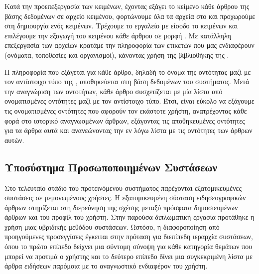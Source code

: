 {{{{{{{{\begin{itemize}
Κατά την προεπεξεργασία των κειμένων, έχοντας εξάγει το κείμενο κάθε άρθρου της βάσης δεδομένων σε αρχείο κειμένου, 
φορτώνουμε όλα τα αρχεία στο {} και προχωρούμε στη δημιουργία ενός {} κειμένων. 
Τρέχουμε το {} εργαλείο {} με είσοδο το {} κειμένων 
και επιλέγουμε την εξαγωγή του κειμένου κάθε άρθρου σε μορφή {} \cite{Gt02}.
Με κατάλληλη επεξεργασία των {} αρχείων κρατάμε την πληροφορία των ετικετών που μας ενδιαφέρουν (ονόματα, τοποθεσίες και οργανισμοί), 
κάνοντας χρήση της βιβλιοθήκης {} \cite{Bs01} της {}. 

Η πληροφορία που εξάγεται για κάθε άρθρο, δηλαδή το όνομα της οντότητας μαζί με τον αντίστοιχο τύπο της {}, 
αποθηκεύεται στη βάση δεδομένων του συστήματος. 
Μετά την αναγνώριση των οντοτήτων, κάθε άρθρο συσχετίζεται με μία λίστα από ονοματισμένες οντότητες μαζί με τον αντίστοιχο τύπο. 
Έτσι, είναι εύκολο να εξάγουμε τις ονοματισμένες οντότητες που αφορούν τον εκάστοτε χρήστη, 
ανατρέχοντας κάθε φορά στο ιστορικό αναγνωσμένων άρθρων, εξάγοντας τις αποθηκευμένες οντότητες για τα άρθρα αυτά 
και ανανεώνοντας την εν λόγω λίστα με τις οντότητες των άρθρων αυτών. 

\end{itemize}

\subsection{Υποσύστημα Προσωποποιημένων Συστάσεων}

Στο τελευταίο στάδιο του προτεινόμενου συστήματος παρέχονται εξατομικευμένες συστάσεις σε μεμονωμένους χρήστες. 
Η εξατομικευμένη σύσταση ειδησεογραφικών άρθρων στηρίζεται στη διερεύνηση της σχέσης μεταξύ 
πρόσφατα δημοσιευμένων άρθρων και του προφίλ του χρήστη. 
Στην παρούσα διπλωματική εργασία προτάθηκε η χρήση μιας υβριδικής μεθόδου συστάσεων. 
Ωστόσο, η διαφοροποίηση από προηγούμενες προσεγγίσεις έγκειται στην πρόταση για διεπίπεδη ιεραρχία συστάσεων, 
όπου το πρώτο επίπεδο δείχνει μια σύντομη σύνοψη για κάθε κατηγορία θεμάτων που μπορεί να προτιμά ο χρήστης και
το δεύτερο επίπεδο δίνει μια συγκεκριμένη λίστα με άρθρα ειδήσεων παρόμοια με το αναγνωστικό ενδιαφέρον του χρήστη. 

}}}}}}}}
